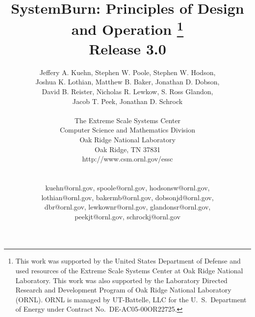 \title{
	SystemBurn: Principles of Design and Operation
	\footnote{
		This work was supported by the United States Department of Defense and used resources of the
		Extreme Scale Systems Center at Oak Ridge National Laboratory.
		This work was also supported by the Laboratory Directed Research and
		Development Program of Oak Ridge National Laboratory (ORNL). ORNL is managed by UT-Battelle,
		LLC for the U.~S.~Department of Energy under Contract No.~DE-AC05-00OR22725.
	} \\
	Release 3.0\\
}

\author{
Jeffery A. Kuehn, Stephen W. Poole, Stephen W. Hodson,\\
Joshua K. Lothian, Matthew B. Baker, Jonathan D. Dobson, \\
David B. Reister, Nicholas R. Lewkow, S. Ross Glandon, \\
Jacob T. Peek, Jonathan D. Schrock \\
\\
The Extreme Scale Systems Center \\
Computer Science and Mathematics Division \\
Oak Ridge National Laboratory \\
Oak Ridge, TN 37831 \\
http://www.csm.ornl.gov/essc\\
\\
\\
kuehn@ornl.gov, spoole@ornl.gov, hodsonsw@ornl.gov,\\
lothian@ornl.gov, bakermb@ornl.gov, dobsonjd@ornl.gov, \\
dbr@ornl.gov, lewkownr@ornl.gov, glandonsr@ornl.gov, \\
peekjt@ornl.gov, schrockj@ornl.gov\\
}
\maketitle
